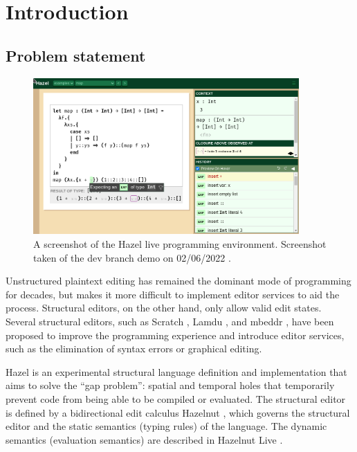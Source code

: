\chapter{Introduction}
\label{sec:introduction}

\section{Problem statement}
\label{sec:prob_stmt}

\begin{figure}
  \centering
  \includegraphics[width=4in]{img/hazel_ui.png}
  \caption[Screenshot of the Hazel live programming environment.]{A screenshot of the Hazel live programming environment. Screenshot taken of the dev branch demo on 02/06/2022 \cite{HazelDemo2022}.}
  \label{fig:screenshot-hazel-ui}
\end{figure}

Unstructured plaintext editing has remained the dominant mode of programming for decades, but makes it more difficult to implement editor services to aid the process. Structural editors, on the other hand, only allow valid edit states. Several structural editors, such as Scratch \cite{maloney2010scratch}, Lamdu \cite{lotem_chuchem}, and mbeddr \cite{voelter2012mbeddr}, have been proposed to improve the programming experience and introduce editor services, such as the elimination of syntax errors or graphical editing.

Hazel \cite{Hazel2022} is an experimental structural language definition and implementation that aims to solve the ``gap problem'': spatial and temporal holes that temporarily prevent code from being able to be compiled or evaluated. The structural editor is defined by a bidirectional edit calculus Hazelnut \cite{conf/popl/Hazelnut17}, which governs the structural editor and the static semantics (typing rules) of the language. The dynamic semantics (evaluation semantics) are described in Hazelnut Live \cite{conf/popl/HazelnutLive19}.

